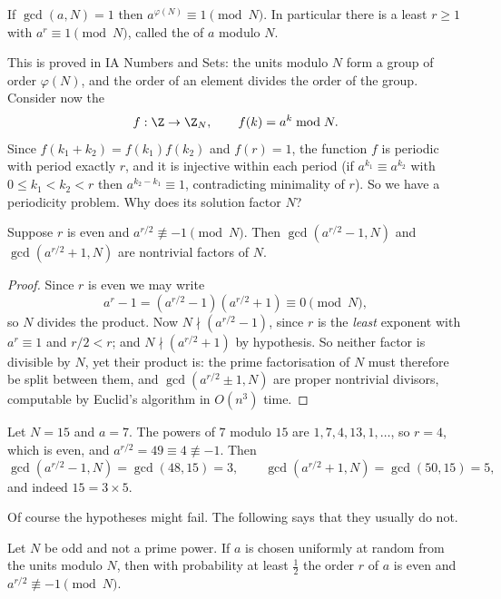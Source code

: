 \begin{theorem}[Euler]
	If $\gcd(a,N)=1$ then $a^{\varphi(N)}\equiv1\pmod N$. In particular there is a least $r\geq1$ with $a^r\equiv1\pmod N$, called the  of $a$ modulo $N$.
\end{theorem}

This is proved in IA Numbers and Sets: the units modulo $N$ form a group of order $\varphi(N)$, and the order of an element divides the order of the group. Consider now the 
$$f:\Z\to\Z_N, \qquad f(k) = a^k\bmod N.$$
Since $f(k_1+k_2) = f(k_1)f(k_2)$ and $f(r)=1$, the function $f$ is periodic with period exactly $r$, and it is injective within each period (if $a^{k_1}\equiv a^{k_2}$ with $0\le k_1<k_2<r$ then $a^{k_2-k_1}\equiv1$, contradicting minimality of $r$). So we have a periodicity problem. Why does its solution factor $N$?

\begin{proposition}
	Suppose $r$ is even and $a^{r/2}\not\equiv-1\pmod N$. Then $\gcd(a^{r/2}-1,N)$ and $\gcd(a^{r/2}+1,N)$ are nontrivial factors of $N$.
\end{proposition}

\begin{proof}
	Since $r$ is even we may write
	$$a^r - 1 = \left(a^{r/2}-1\right)\left(a^{r/2}+1\right)\equiv 0\pmod N,$$
	so $N$ divides the product. Now $N\nmid(a^{r/2}-1)$, since $r$ is the \emph{least} exponent with $a^r\equiv1$ and $r/2 < r$; and $N\nmid(a^{r/2}+1)$ by hypothesis. So neither factor is divisible by $N$, yet their product is: the prime factorisation of $N$ must therefore be split between them, and $\gcd(a^{r/2}\pm1,N)$ are proper nontrivial divisors, computable by Euclid's algorithm in $O(n^3)$ time.
\end{proof}

\begin{example}
	Let $N = 15$ and $a = 7$. The powers of $7$ modulo $15$ are $1,7,4,13,1,\dots$, so $r = 4$, which is even, and $a^{r/2} = 49 \equiv 4\not\equiv-1$. Then
	$$\gcd(a^{r/2}-1, N) = \gcd(48,15)=3, \qquad \gcd(a^{r/2}+1,N)=\gcd(50,15)=5,$$
	and indeed $15 = 3\times5$.
\end{example}

Of course the hypotheses might fail. The following says that they usually do not.

\begin{theorem}
	Let $N$ be odd and not a prime power. If $a$ is chosen uniformly at random from the units modulo $N$, then with probability at least $\tfrac12$ the order $r$ of $a$ is even and $a^{r/2}\not\equiv-1\pmod N$.
\end{theorem}

